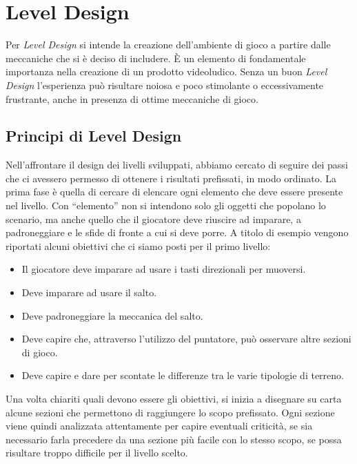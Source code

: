 \section{Level Design}
\label{sec:level_design}

Per \textit{Level Design} si intende la creazione dell’ambiente di gioco a partire dalle meccaniche che si è deciso di includere. È un elemento di fondamentale importanza nella creazione di un prodotto videoludico. Senza un buon \textit{Level Design} l’esperienza può risultare noiosa e poco stimolante o eccessivamente frustrante, anche in presenza di ottime meccaniche di gioco.

\subsection{Principi di Level Design}
\label{sec:principi_level_design}

Nell’affrontare il design dei livelli sviluppati, abbiamo cercato di seguire dei passi che ci avessero permesso di ottenere i risultati prefissati, in modo ordinato.
La prima fase è quella di cercare di elencare ogni elemento che deve essere presente nel livello. Con “elemento” non si intendono solo gli oggetti che popolano lo scenario, ma anche quello che il giocatore deve riuscire ad imparare, a padroneggiare e le sfide di fronte a cui si deve porre. A titolo di esempio vengono riportati alcuni obiettivi che ci siamo posti per il primo livello:

\begin{itemize}
	\item Il giocatore deve imparare ad usare i tasti direzionali per muoversi.
	\item Deve imparare ad usare il salto.
	\item Deve padroneggiare la meccanica del salto.
	\item Deve capire che, attraverso l’utilizzo del puntatore, può osservare altre sezioni di gioco.
	\item Deve capire e dare per scontate le differenze tra le varie tipologie di terreno.
\end{itemize}

Una volta chiariti quali devono essere gli obiettivi, si inizia a disegnare su carta alcune sezioni che permettono di raggiungere lo scopo prefissato. Ogni sezione viene quindi analizzata attentamente per capire eventuali criticità, se sia necessario farla precedere da una sezione più facile con lo stesso scopo, se possa risultare troppo difficile per il livello scelto.

